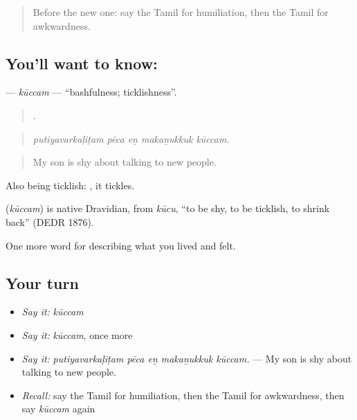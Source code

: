 \label{lesson:TA-C462-kuccam}



\begin{quote}
Before the new one: say the Tamil for humiliation, then the Tamil for awkwardness.
\end{quote}

\subsection*{You'll want to know: }
\textbf{} — \emph{kūccam} — \textquotedblleft{}bashfulness; ticklishness\textquotedblright{}.

\begin{quote}
    .
\end{quote}

\begin{quote}
\emph{putiyavarkaḷiṭam pēca eṉ makaṉukkuk kūccam.}
\end{quote}

\begin{quote}
My son is shy about talking to new people.
\end{quote}

Also being ticklish:  , it tickles.

\begin{cousinweb}
\textbf{} (\emph{kūccam}) is native Dravidian, from  \emph{kūcu}, \textquotedblleft{}to be shy, to be ticklish, to shrink back\textquotedblright{} (DEDR 1876).
\end{cousinweb}

\begin{grammarlens}[title={What you've built}]
One more word for describing what you lived and felt.
\end{grammarlens}

\subsection*{Your turn}
\begin{itemize}
\raggedright
  \item \emph{Say it:} \emph{kūccam}
  \item \emph{Say it:} \emph{kūccam}, once more
  \item \emph{Say it:} \emph{putiyavarkaḷiṭam pēca eṉ makaṉukkuk kūccam.} — My son is shy about talking to new people.
  \item \emph{Recall:} say the Tamil for humiliation, then the Tamil for awkwardness, then say \emph{kūccam} again
\end{itemize}

